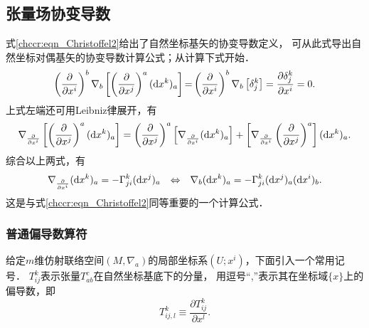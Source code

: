 \subsection{张量场协变导数}
式\eqref{chccr:eqn_Christoffel2}给出了自然坐标基矢的协变导数定义，
可从此式导出自然坐标对偶基矢的协变导数计算公式；从计算下式开始．
\begin{equation}
    \left(\frac{\partial }{\partial x^i}\right) ^b \nabla_b
    \left[\left(\frac{\partial }{\partial x^j}\right) ^a ({\rm d}x^k)_a \right]{=}
    \left(\frac{\partial }{\partial x^i}\right) ^b \nabla_b \left[\delta_j^k \right]
    = \frac{\partial \delta_j^k}{\partial x^i} =0.
\end{equation}
上式左端还可用Leibniz律展开，有
\begin{equation*}
    \nabla_{\frac{\partial }{\partial x^i}}
    \left[\left(\frac{\partial }{\partial x^j}\right) ^a ({\rm d}x^k)_a \right]
   =\left(\frac{\partial }{\partial x^j}\right) ^a  \left[
    \nabla_{\frac{\partial }{\partial x^i}}  ({\rm d}x^k)_a \right]
    +\left[\nabla_{\frac{\partial }{\partial x^i}}
    \left(\frac{\partial }{\partial x^j}\right) ^a  \right]({\rm d}x^k)_a .
\end{equation*}
综合以上两式，有
\begin{equation}\label{chccr:eqn_Ddualbase}
    \nabla_{\frac{\partial }{\partial x^i}}  ({\rm d}x^k)_a = -  \Gamma_{ji}^k ({\rm d}x^j)_a
    {\quad \Leftrightarrow \quad}
    \nabla_b  ({\rm d}x^k)_a = - \Gamma_{ji}^k ({\rm d}x^j)_a ({\rm d}x^i)_b.
\end{equation}
这是与式\eqref{chccr:eqn_Christoffel2}同等重要的一个计算公式．

\subsubsection{普通偏导数算符}

给定$m$维仿射联络空间$(M,\nabla_a)$的局部坐标系$(U;x^i)$，下面引入一个常用记号．
$T_{ij}^k$表示张量$T_{ab}^c$在自然坐标基底下的分量，
用逗号“,”表示其在坐标域$\{x\}$上的偏导数，即
\begin{equation}
    T^k_{ij,l} \equiv \frac{\partial T^k_{ij}}{\partial x^l} .
\end{equation}


